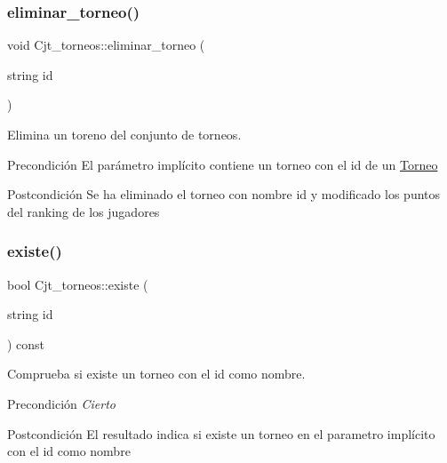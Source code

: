 \subsubsection{\texorpdfstring{eliminar\+\_\+torneo()}{eliminar\_torneo()}}
{\footnotesize\ttfamily void Cjt\+\_\+torneos\+::eliminar\+\_\+torneo (\begin{DoxyParamCaption}\item[{string}]{id }\end{DoxyParamCaption})}



Elimina un toreno del conjunto de torneos. 

\begin{DoxyPrecond}{Precondición}
El parámetro implícito contiene un torneo con el id de un \hyperlink{class_torneo}{Torneo} 
\end{DoxyPrecond}
\begin{DoxyPostcond}{Postcondición}
Se ha eliminado el torneo con nombre id y modificado los puntos del ranking de los jugadores 
\end{DoxyPostcond}
\mbox{\label{class_cjt__torneos_a1c36520142bc446e3f0b2fb9701246c2}} 
\subsubsection{\texorpdfstring{existe()}{existe()}}
{\footnotesize\ttfamily bool Cjt\+\_\+torneos\+::existe (\begin{DoxyParamCaption}\item[{string}]{id }\end{DoxyParamCaption}) const}



Comprueba si existe un torneo con el id como nombre. 

\begin{DoxyPrecond}{Precondición}
{\itshape Cierto} 
\end{DoxyPrecond}
\begin{DoxyPostcond}{Postcondición}
El resultado indica si existe un torneo en el parametro implícito con el id como nombre 
\end{DoxyPostcond}
\mbox{\label{class_cjt__torneos_a5ba68f778eee8e1050a7f0916755dfa0}} 
